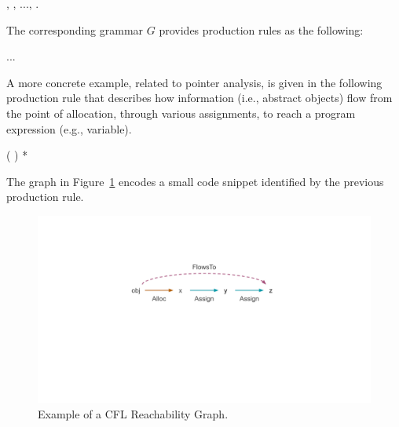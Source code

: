 \begin{displayquote}
\begin{datalog}
 \dlIf{} , , ..., .
\end{datalog}
\end{displayquote}

The corresponding grammar $G$ provides production rules as the following:

\begin{displayquote}
\begin{datalog}
 \dlIfInv{}   ... 
\end{datalog}
\end{displayquote}

A more concrete example, related to pointer analysis, is given in the following production rule that describes how information (i.e., abstract objects) flow from the point of allocation, through various assignments, to reach a program expression (e.g., variable).

\begin{displayquote}
\begin{datalog}
 \dlIfInv{}  (  ) *
\end{datalog}
\end{displayquote}

The graph in Figure~\ref{fig:related:cfl} encodes a small code snippet identified by the previous production rule.

\begin{figure}[ht]
\centering
\includegraphics[trim={40mm 75mm 40mm 35mm},clip,width=1\linewidth]{assets/related/CFL.pdf}
\caption[Example of a CFL-Reachability Graph]{Example of a CFL Reachability Graph.}
\label{fig:related:cfl}
\end{figure}

